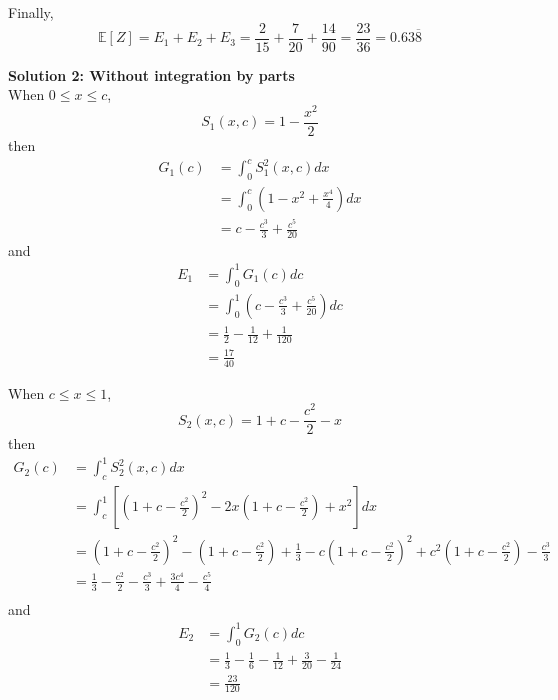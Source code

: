 \documentclass[12pt]{simple_doc}
\begin{document}
    Finally,
    \begin{equation}
        \mathbb{E}[Z] = E_1 + E_2 + E_3 = \frac{2}{15} + \frac{7}{20} + \frac{14}{90}
                      = \frac{23}{36} = 0.63\overline{8}
    \end{equation}


    \medskip
    \textbf{Solution 2: Without integration by parts}\\
    When $0 \leqslant x \leqslant c$,
    \begin{equation}
        S_1(x, c) = 1 - \frac{x^2}{2}
    \end{equation}
    then
    \begin{equation}
		\begin{aligned}
		G_1(c) &= \int_0^c S_1^2(x, c) dx \\
		   &= \int_0^c (1 - x^2 + \frac{x^4}{4}) dx\\
           &= c - \frac{c^3}{3} + \frac{c^5}{20}
		\end{aligned}
	\end{equation}
    and
    \begin{equation}
		\begin{aligned}
		E_1 &= \int_0^1 G_1(c) dc \\
		   &= \int_0^1 ( c - \frac{c^3}{3} + \frac{c^5}{20}) dc\\
           &= \frac{1}{2} - \frac{1}{12} + \frac{1}{120}\\
           &= \frac{17}{40}
		\end{aligned}
	\end{equation}

    When $c \leqslant x \leqslant 1$,
    \begin{equation}
        S_2(x, c) = 1 + c - \frac{c^2}{2} - x
    \end{equation}
    then
    \begin{equation}
		\begin{aligned}
		G_2(c) &= \int_c^1 S_2^2(x, c) dx \\
		   &= \int_c^1 [(1 + c - \frac{c^2}{2})^2 - 2x(1 + c - \frac{c^2}{2}) + x^2] dx\\
           &= (1 + c - \frac{c^2}{2})^2 - (1 + c - \frac{c^2}{2}) + \frac{1}{3}
             - c(1 + c - \frac{c^2}{2})^2 + c^2(1 + c - \frac{c^2}{2}) - \frac{c^3}{3}\\
           &= \frac{1}{3} - \frac{c^2}{2} - \frac{c^3}{3} + \frac{3c^4}{4} - \frac{c^5}{4}\\
		\end{aligned}
	\end{equation}
    and
    \begin{equation}
		\begin{aligned}
		E_2 &= \int_0^1 G_2(c) dc \\
		   &= \frac{1}{3} - \frac{1}{6} - \frac{1}{12} + \frac{3}{20} - \frac{1}{24}\\
           &= \frac{23}{120}
		\end{aligned}
	\end{equation}
\end{document}
